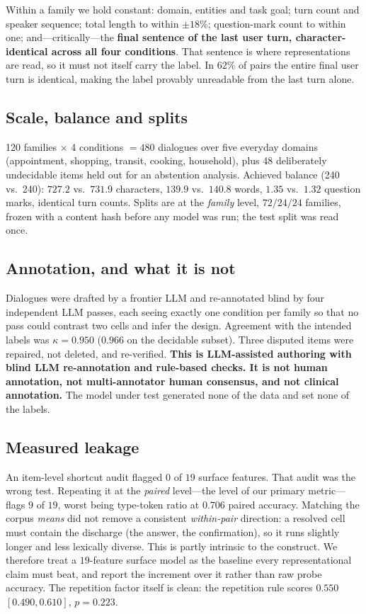 \documentclass[conference]{IEEEtran}
\begin{document}
Within a family we hold constant: domain, entities and task goal; turn count and speaker sequence;
total length to within $\pm18\%$; question-mark count to within one; and---critically---the
\textbf{final sentence of the last user turn, character-identical across all four conditions}. That
sentence is where representations are read, so it must not itself carry the label. In $62\%$ of
pairs the entire final user turn is identical, making the label provably unreadable from the last
turn alone.

\subsection{Scale, balance and splits}
120 families $\times$ 4 conditions $=480$ dialogues over five everyday domains (appointment,
shopping, transit, cooking, household), plus 48 deliberately undecidable items held out for an
abstention analysis. Achieved balance (240 vs.\ 240): $727.2$ vs.\ $731.9$ characters, $139.9$
vs.\ $140.8$ words, $1.35$ vs.\ $1.32$ question marks, identical turn counts. Splits are at the
\emph{family} level, $72/24/24$ families, frozen with a content hash before any model was run; the
test split was read once.

\subsection{Annotation, and what it is not}
Dialogues were drafted by a frontier LLM and re-annotated blind by four independent LLM passes, each
seeing exactly one condition per family so that no pass could contrast two cells and infer the
design. Agreement with the intended labels was $\kappa=0.950$ ($0.966$ on the decidable subset).
Three disputed items were repaired, not deleted, and re-verified. \textbf{This is LLM-assisted
authoring with blind LLM re-annotation and rule-based checks. It is not human annotation, not
multi-annotator human consensus, and not clinical annotation.} The model under test generated none
of the data and set none of the labels.

\subsection{Measured leakage}
An item-level shortcut audit flagged $0$ of $19$ surface features. That audit was the wrong test.
Repeating it at the \emph{paired} level---the level of our primary metric---flags $9$ of $19$, worst
being type-token ratio at $0.706$ paired accuracy. Matching the corpus \emph{means} did not remove a
consistent \emph{within-pair} direction: a resolved cell must contain the discharge (the answer, the
confirmation), so it runs slightly longer and less lexically diverse. This is partly intrinsic to
the construct. We therefore treat a $19$-feature surface model as the baseline every
representational claim must beat, and report the increment over it rather than raw probe accuracy.
The repetition factor itself is clean: the repetition rule scores $0.550$ $[0.490,0.610]$, $p=0.223$.
\end{document}
